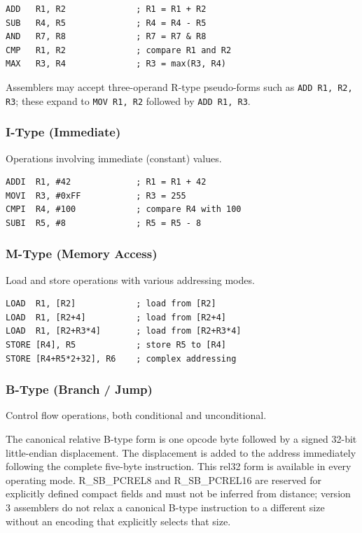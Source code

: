 \documentclass[11pt]{article}
\begin{document}
\begin{lstlisting}
ADD   R1, R2              ; R1 = R1 + R2
SUB   R4, R5              ; R4 = R4 - R5
AND   R7, R8              ; R7 = R7 & R8
CMP   R1, R2              ; compare R1 and R2
MAX   R3, R4              ; R3 = max(R3, R4)
\end{lstlisting}

Assemblers may accept three-operand R-type pseudo-forms such as \texttt{ADD R1, R2, R3}; these expand to \texttt{MOV R1, R2} followed by \texttt{ADD R1, R3}.

\subsubsection{I-Type (Immediate)}

Operations involving immediate (constant) values.

\begin{lstlisting}
ADDI  R1, #42             ; R1 = R1 + 42
MOVI  R3, #0xFF           ; R3 = 255
CMPI  R4, #100            ; compare R4 with 100
SUBI  R5, #8              ; R5 = R5 - 8
\end{lstlisting}

\subsubsection{M-Type (Memory Access)}

Load and store operations with various addressing modes.

\begin{lstlisting}
LOAD  R1, [R2]            ; load from [R2]
LOAD  R1, [R2+4]          ; load from [R2+4]
LOAD  R1, [R2+R3*4]       ; load from [R2+R3*4]
STORE [R4], R5            ; store R5 to [R4]
STORE [R4+R5*2+32], R6    ; complex addressing
\end{lstlisting}

\subsubsection{B-Type (Branch / Jump)}

Control flow operations, both conditional and unconditional.

The canonical relative B-type form is one opcode byte followed by a signed
32-bit little-endian displacement. The displacement is added to the address
immediately following the complete five-byte instruction. This rel32 form is
available in every operating mode. R\_SB\_PCREL8 and R\_SB\_PCREL16 are reserved
for explicitly defined compact fields and must not be inferred from distance;
version 3 assemblers do not relax a canonical B-type instruction to a different
size without an encoding that explicitly selects that size.
\end{document}
